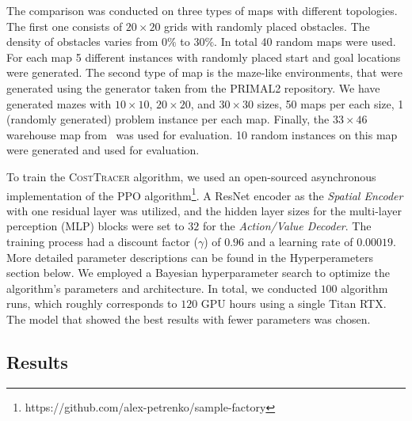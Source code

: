 \documentclass[letterpaper]{article} %
\begin{document}
The comparison was conducted on three types of maps with different topologies. The first one consists of $20\times20$ grids with randomly placed obstacles. The density of obstacles varies from $0\%$ to $30\%$. In total 40 random maps were used. For each map 5 different instances with randomly placed start and goal locations were generated. The second type of map is the maze-like environments, that were generated using the generator taken from the PRIMAL2 repository. We have generated mazes with $10\times10$, $20\times20$, and $30\times30$ sizes, 50 maps per each size, 1 (randomly generated) problem instance per each map. Finally, the $33 \times 46$ warehouse map from~\cite{li2021lifelong} was used for evaluation. 10 random instances on this map were generated and used for evaluation.



To train the \textsc{CostTracer} algorithm, we used an open-sourced asynchronous implementation of the PPO algorithm\footnote{https://github.com/alex-petrenko/sample-factory}. A ResNet encoder as the \textit{Spatial Encoder} with one residual layer was utilized, and the hidden layer sizes for the multi-layer perception (MLP) blocks were set to $32$ for the \textit{Action/Value Decoder}. The training process had a discount factor ($\gamma$) of $0.96$ and a learning rate of $0.00019$. More detailed parameter descriptions can be found in the Hyperperameters section below.
We employed a Bayesian hyperparameter search to optimize the algorithm's parameters and architecture. In total, we conducted $100$ algorithm runs, which roughly corresponds to $120$ GPU hours using a single Titan RTX. The model that showed the best results with fewer parameters was chosen.

\subsection{Results}
\end{document}
